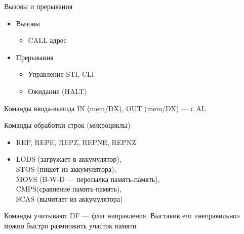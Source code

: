 \documentclass[xetex,aspectratio=43]{beamer}
\begin{document}
\begin{frame}{Вызовы и прерывания}
    \begin{itemize}
        \tightlist
        \item
        Вызовы

        \begin{itemize}
            \tightlist
            \item
            CALL адрес
        \end{itemize}
        \item
        Прерывания

        \begin{itemize}
            \tightlist
            \item
            Управление STI, CLI
            \item
            Ожидание (HALT)
        \end{itemize}
    \end{itemize}
\end{frame}

\begin{frame}{Команды ввода-вывода}
    IN (mem/DX), OUT (mem/DX) --- с AL
\end{frame}

\begin{frame}{Команды обработки строк (микроциклы)}
    \begin{itemize}
        \item
        REP, REPE, REPZ, REPNE, REPNZ
        \item
        LODS (загружает в аккумулятор),\\
        STOS (пишет из аккумулятора),\\
        MOVS (B-W-D --- пересылка память-память),\\
        CMPS(сравнение память-память),\\
        SCAS (вычитает из аккумулятора)
    \end{itemize}

    \pause

    Команды учитывают DF --- флаг направления. Выставив его «неправильно»
    можно быстро размножить участок памяти
\end{frame}
\end{document}
